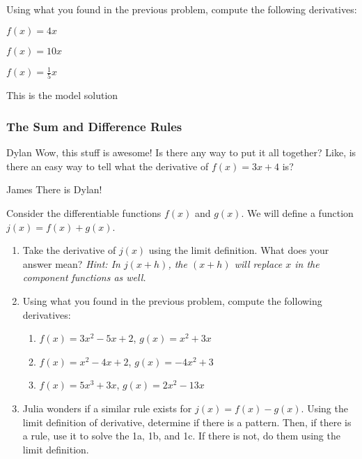 \documentclass{ximera}
\begin{document}
\begin{question}
\item{Using what you found in the previous problem, compute the following derivatives:}
\item{$f(x)=4x$}
\item{$f(x)=10x$}
\item{$f(x)=\frac{1}{5}x$}
\begin{freeResponse}
This is the model solution %
\end{freeResponse}
\end{question}

\subsubsection{The Sum and Difference Rules}
\begin{dialogue}
\item[Dylan] Wow, this stuff is awesome! Is there any way to put it all together? Like, is there an easy way to tell what the derivative of $f(x) = 3x+4$ is?
\item[James] There is Dylan! 
\end{dialogue}
Consider the differentiable functions $f(x)$ and $g(x)$. We will define a function $j(x) = f(x) + g(x)$.


\begin{enumerate}
\item{Take the derivative of $j(x)$ using the limit definition. What does your answer mean? \textit{Hint: In $j(x+h)$, the $(x+h)$ will replace $x$ in the component functions as well.}}
\item{Using what you found in the previous problem, compute the following derivatives:
\begin{enumerate}
\item{$f(x) = 3x^2 - 5x + 2$, $g(x) = x^2 + 3x$}
\item{$f(x) = x^2 - 4x + 2$, $g(x) = -4x^2 + 3$}
\item{$f(x) = 5x^3 + 3x$, $g(x) = 2x^2 - 13x$}
\end{enumerate}
}
\item{Julia wonders if a similar rule exists for $j(x) = f(x)-g(x)$. Using the limit definition of derivative, determine if there is a pattern. Then, if there is a rule, use it to solve the 1a, 1b, and 1c. If there is not, do them using the limit definition.}
\end{enumerate}
\end{document}
